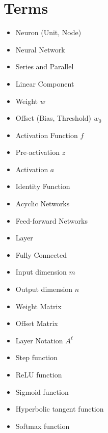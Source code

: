 \pagebreak

\section*{Terms}

    \begin{itemize}
        \item Neuron (Unit, Node)
        \item Neural Network
        \item Series and Parallel
        \item Linear Component
        \item Weight $w$
        \item Offset (Bias, Threshold) $w_0$
        \item Activation Function $f$
        \item Pre-activation $z$
        \item Activation $a$
        \item Identity Function
        \item Acyclic Networks
        \item Feed-forward Networks
        \item Layer
        \item Fully Connected
        \item Input dimension $m$
        \item Output dimension $n$
        \item Weight Matrix
        \item Offset Matrix
        \item Layer Notation $A^\ell$
        \item Step function
        \item ReLU function
        \item Sigmoid function
        \item Hyperbolic tangent function
        \item Softmax function
    \end{itemize}
    
    
